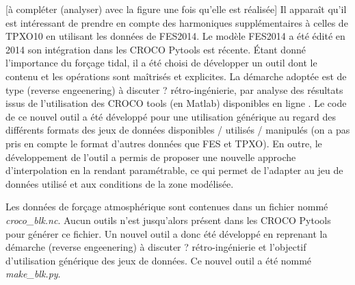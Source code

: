 \documentclass[10pt,a4paper,titlepage]{article}
\begin{document}
    \alert{[à compléter (analyser) avec la figure une fois qu'elle est réalisée]}
    Il apparaît qu'il est intéressant de prendre en compte des harmoniques supplémentaires à celles de TPXO10 en utilisant les données de FES2014.
    \alert{Le modèle FES2014 a été édité en 2014 son intégration dans les CROCO Pytools est récente.}
    Étant donné l'importance du forçage tidal, il a été choisi de développer un outil dont le contenu et les opérations sont maîtrisés et explicites.
    La démarche adoptée est de type \alert{(reverse engeenering) à discuter ?} rétro-ingénierie, par analyse des résultats issus de l'utilisation des CROCO tools (en Matlab) disponibles en ligne \parencite{croco_files_examples}.
    Le code de ce nouvel outil a été développé pour une utilisation générique au regard des différents formats des jeux de données disponibles \alert{ / utilisés / manipulés (on a pas pris en compte le format d'autres données que FES et TPXO)}.
    En outre, le développement de l'outil a permis de proposer une nouvelle approche d'interpolation en la rendant paramétrable, ce qui permet de l'adapter au jeu de données utilisé et aux conditions de la zone modélisée.
    
    Les données de forçage atmosphérique sont contenues dans un fichier nommé \textit{croco\_blk.nc}.
    Aucun outils n'est jusqu'alors présent dans les CROCO Pytools pour générer ce fichier.
    Un nouvel outil a donc été développé en reprenant la démarche \alert{(reverse engeenering) à discuter ?} rétro-ingénierie et l'objectif d'utilisation générique des jeux de données.
    Ce nouvel outil a été nommé \textit{make\_blk.py}.
    
\end{document}
